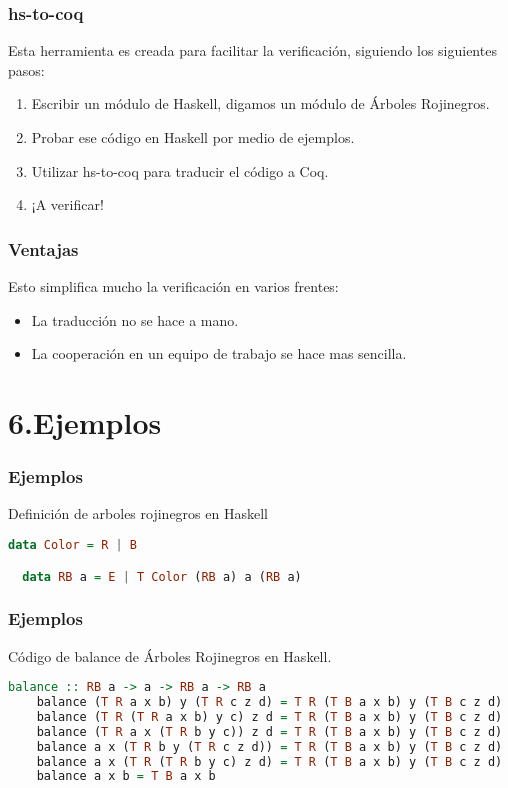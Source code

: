 \documentclass[xcolor=dvipsnames,table,handout]{beamer}
\begin{document}
\begin{frame}
  \frametitle{hs-to-coq}
        Esta herramienta es creada para facilitar la verificación, siguiendo los 
siguientes pasos:
        \begin{enumerate}
            \item Escribir un módulo de Haskell, digamos un módulo de Árboles 
Rojinegros.
            \item Probar ese código en Haskell por medio de ejemplos.
            \item Utilizar hs-to-coq para traducir el código a Coq.
            \item ¡A verificar!
        \end{enumerate}
\end{frame}


\begin{frame}[fragile]
  \frametitle{Ventajas}
        Esto simplifica mucho la verificación en varios frentes:
         \begin{itemize}
            \item La traducción no se hace a mano.
            \item La cooperación en un equipo de trabajo se hace mas sencilla.
        \end{itemize}
\end{frame}
\section{6.Ejemplos}

\begin{frame}[fragile]
  \frametitle{Ejemplos}

  Definición de arboles rojinegros en Haskell
  \begin{lstlisting}[language=haskell]
  data Color = R | B

  data RB a = E | T Color (RB a) a (RB a)
  \end{lstlisting}

\end{frame}


\begin{frame}[fragile]
  \frametitle{Ejemplos}
  Código de balance de Árboles Rojinegros en Haskell.
       \begin{lstlisting}[language=haskell]
    balance :: RB a -> a -> RB a -> RB a
    balance (T R a x b) y (T R c z d) = T R (T B a x b) y (T B c z d)
    balance (T R (T R a x b) y c) z d = T R (T B a x b) y (T B c z d)
    balance (T R a x (T R b y c)) z d = T R (T B a x b) y (T B c z d)
    balance a x (T R b y (T R c z d)) = T R (T B a x b) y (T B c z d)
    balance a x (T R (T R b y c) z d) = T R (T B a x b) y (T B c z d)
    balance a x b = T B a x b
       \end{lstlisting}
\end{frame}
\end{document}

